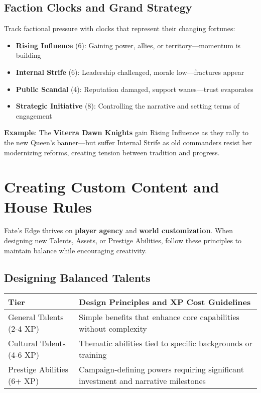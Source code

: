 \subsection*{Faction Clocks and Grand Strategy}

Track factional pressure with clocks that represent their changing fortunes:

\begin{itemize}
    \item \textbf{Rising Influence} (6): Gaining power, allies, or territory—momentum is building
    \item \textbf{Internal Strife} (6): Leadership challenged, morale low—fractures appear
    \item \textbf{Public Scandal} (4): Reputation damaged, support wanes—trust evaporates
    \item \textbf{Strategic Initiative} (8): Controlling the narrative and setting terms of engagement
\end{itemize}

\textbf{Example}: The \textbf{Viterra Dawn Knights} gain Rising Influence as they rally to the new Queen's banner—but suffer Internal Strife as old commanders resist her modernizing reforms, creating tension between tradition and progress.

\section*{Creating Custom Content and House Rules}

Fate's Edge thrives on \textbf{player agency} and \textbf{world customization}. When designing new Talents, Assets, or Prestige Abilities, follow these principles to maintain balance while encouraging creativity.

\subsection*{Designing Balanced Talents}

\begin{fatebox}
\begin{tabularx}{\textwidth}{lX}
\toprule
\textbf{Tier} & \textbf{Design Principles and XP Cost Guidelines} \\
\midrule
General Talents (2-4 XP) & Simple benefits that enhance core capabilities without complexity \\
Cultural Talents (4-6 XP) & Thematic abilities tied to specific backgrounds or training \\
Prestige Abilities (6+ XP) & Campaign-defining powers requiring significant investment and narrative milestones \\
\bottomrule
\end{tabularx}
\end{fatebox}

